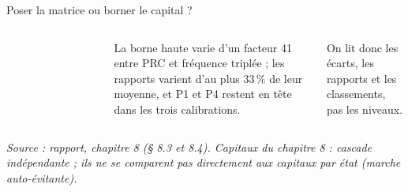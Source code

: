 \documentclass[aspectratio=169,10pt,t]{beamer}
\newcommand{\source}[1]{\par\vfill{\tiny\color{gris}\textit{Source : #1}}\par\vspace{-1mm}}
\begin{document}
\begin{frame}{Poser la matrice ou borner le capital ?}
\begin{columns}[T,onlytextwidth]
\begin{tabular}{@{}lrrr@{}}
      \bottomrule
    \end{tabular}\par\vspace{1.5mm}
    La borne haute varie d'un facteur 41 entre PRC et fréquence triplée ; les rapports varient d'au plus $33\,\%$ de leur moyenne, et P1 et P4 restent en tête dans les trois calibrations.\par\vspace{1mm}
    {\color{accent}On lit donc les écarts, les rapports et les classements, pas les niveaux.}
  \end{columns}
  \source{rapport, chapitre 8 (§ 8.3 et 8.4). Capitaux du chapitre 8 : cascade indépendante ; ils ne se comparent pas directement aux capitaux par état (marche auto-évitante).}
\end{frame}
\end{document}
